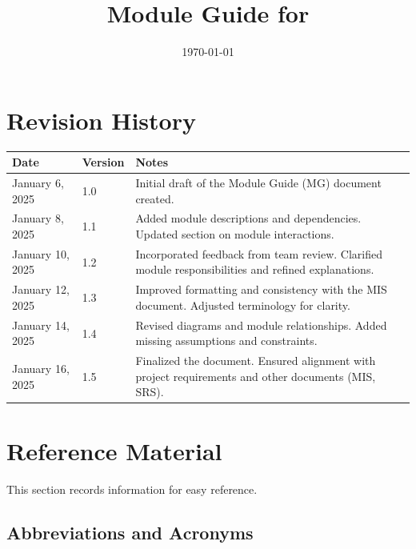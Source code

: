 \documentclass[12pt, titlepage]{article}
\begin{document}
\title{Module Guide for \progname{}} 
\author{\authname}
\date{\today}

\maketitle


\section{Revision History}

\begin{tabularx}{\textwidth}{p{3cm}p{2cm}X}
\toprule {\bf Date} & {\bf Version} & {\bf Notes}\\
\midrule
January 6, 2025 & 1.0 & Initial draft of the Module Guide (MG) document created.\\
January 8, 2025 & 1.1 & Added module descriptions and dependencies. Updated section on module interactions.\\
January 10, 2025 & 1.2 & Incorporated feedback from team review. Clarified module responsibilities and refined explanations.\\
January 12, 2025 & 1.3 & Improved formatting and consistency with the MIS document. Adjusted terminology for clarity.\\
January 14, 2025 & 1.4 & Revised diagrams and module relationships. Added missing assumptions and constraints.\\
January 16, 2025 & 1.5 & Finalized the document. Ensured alignment with project requirements and other documents (MIS, SRS).\\
\bottomrule
\end{tabularx}

\newpage

\section{Reference Material}

This section records information for easy reference.

\subsection{Abbreviations and Acronyms}
\end{document}
